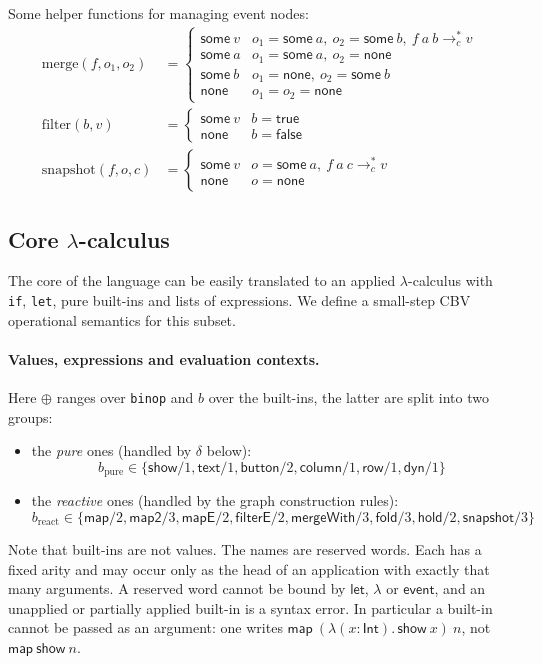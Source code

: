 \documentclass{article}
\newcommand{\kw}[1]{\mathsf{#1}}
\newcommand{\none}{\kw{none}}
\newcommand{\some}[1]{\kw{some}\ #1}
\newcommand{\cstar}{\mathrel{\longrightarrow_{c}^{*}}}
\begin{document}
\medskip
Some helper functions for managing event nodes:
\begin{align*}
\mathrm{merge}(f,o_1,o_2) &= \begin{cases}\some{v} & o_1 = \some{a},\ o_2 = \some{b},\ f\ a\ b \cstar v\\ \some{a} & o_1 = \some{a},\ o_2 = \none\\ \some{b} & o_1 = \none,\ o_2 = \some{b}\\ \none & o_1 = o_2 = \none\end{cases}\\
\mathrm{filter}(b,v) &= \begin{cases}\some{v} & b = \kw{true}\\ \none & b = \kw{false}\end{cases}\\
\mathrm{snapshot}(f,o,c) &= \begin{cases}\some{v} & o = \some{a},\ f\ a\ c \cstar v\\ \none & o = \none\end{cases}
\end{align*}

\subsection{Core $ \lambda $-calculus}\label{sec:core}
The core of the language can be easily translated to an applied $ \lambda $-calculus with \texttt{if}, \texttt{let}, pure built-ins and lists of expressions. We define a small-step CBV operational semantics for this subset.


\paragraph{Values, expressions and evaluation contexts.}
Here $\oplus$ ranges over \texttt{binop} and $b$ over the built-ins, the latter are split into two groups:
\begin{itemize}
  \item the \emph{pure} ones (handled by $\delta$ below): 
    \[
    b_{\mathrm{pure}} \in \{\kw{show}/1, \kw{text}/1, \kw{button}/2, \kw{column}/1, \kw{row}/1, \kw{dyn}/1\}
    \]
  \item the \emph{reactive} ones (handled by the graph construction rules):
    \[
      b_{\mathrm{react}} \in \{\kw{map}/2, \kw{map2}/3, \kw{mapE}/2, \kw{filterE}/2, \kw{mergeWith}/3, \kw{fold}/3, \kw{hold}/2, \kw{snapshot}/3\}
    \]
\end{itemize}
Note that built-ins are not values. The names are reserved words. Each has a fixed arity and may occur only as the head of an application with exactly that many arguments. A reserved word cannot be bound by $\kw{let}$, $\lambda$ or $\kw{event}$, and an unapplied or partially applied built-in is a syntax error. In particular a built-in cannot be passed as an argument: one writes $\kw{map}\ (\lambda(x{:}\kw{Int}).\,\kw{show}\ x)\ n$, not $\kw{map}\ \kw{show}\ n$.
\end{document}
